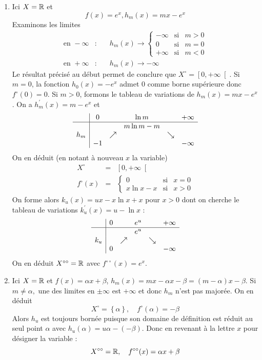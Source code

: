 \begin{enumerate}
\item  Ici $X=\mathbb{R}$ et 
\[f(x)=e^{x} , h_{m}(x)=mx-e^{x}\]
Examinons les limites 
\begin{eqnarray*}
\text{en }-\infty  &:&\quad h_{m}(x)\rightarrow \left\{
\begin{array}{ccc}
-\infty  & \text{si} & m>0 \\
0 & \text{si} & m=0 \\
+\infty  & \text{si} & m<0
\end{array}
\right.  \\
\text{en }+\infty  &:&\quad h_{m}(x)\rightarrow -\infty
\end{eqnarray*}
Le r\'{e}sultat pr\'{e}cis\'{e} au début permet de conclure que $X^{\circ }=\left[ 0,+\infty \right[ $.\newline
Si $m=0$, la fonction $h_{0}(x)=-e^{x}$ admet $0$ comme borne sup\'{e}rieure donc $f^{\circ }(0)=0$.\newline
Si $m>0$, formons le tableau de variations de $h_{m}(x)=mx-e^{x}$.\newline
On a $h_{m}^{\prime }(x)=m-e^{x}$ et
\[
\begin{array}{c|ccccc}
& 0 &  & \ln m &  & +\infty  \\
\hline
&  &  & m\ln m-m &  &  \\
h_{m} &  & \nearrow  &  & \searrow  &  \\
& -1 &  &  &  & -\infty
\end{array}
\]
On en d\'{e}duit (en notant \`{a} nouveau $x$ la variable)
\begin{eqnarray*}
X^{\circ } &=&\left[ 0,+\infty \right[  \\
f^{\circ }(x) &=&\left\{
\begin{array}{ccc}
0 & \text{si} & x=0 \\
x\ln x-x & \text{si} & x>0
\end{array}
\right.
\end{eqnarray*}
On forme alors $k_{u}(x)=ux-x\ln x + x$ pour $x>0$ dont on cherche le tableau de variations $k_{u}^{\prime }(x)=u-\ln x$ :
\[
\begin{array}{c|ccccc}
& 0 &  & e^{u} &  & +\infty  \\
\hline
&  &  & e^{u} &  &  \\
k_{u} &  & \nearrow  &  & \searrow  &  \\
& 0 &  &  &  & -\infty
\end{array}
\]
On en d\'{e}duit $X^{\circ \circ }=\mathbb{R}$ avec $f^{\circ \circ}(x)=e^{x}$.

\item  Ici $X=\mathbb{R}$ et $f(x)=\alpha x+\beta $, $h_{m}(x)=mx-\alpha x-\beta =(m-\alpha )x-\beta $. Si $m\neq \alpha ,$ une des limites en $\pm \infty $ est $+\infty $ et donc $h_{m}$ n'est pas major\'{e}e$.$ On en d\'{e}duit
\[
X^{\circ }=\left\{ \alpha \right\} ,\quad f^{\circ }(\alpha)=-\beta
\]
Alors $h_{u}$ est toujours born\'{e}e puisque son domaine de d\'{e}finition est r\'{e}duit au seul point $\alpha $ avec $h_{u}(\alpha )=u\alpha -(-\beta )$. Donc en revenant \`{a} la lettre $x$ pour d\'{e}signer la variable :
\[
X^{\circ \circ }=\mathbb{R},\quad f^{\circ \circ }(x)=\alpha x+\beta
\]


\end{enumerate}
